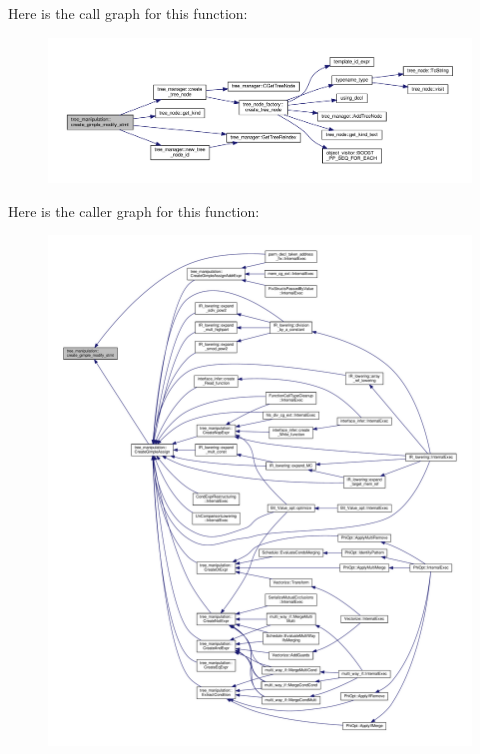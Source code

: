 Here is the call graph for this function\+:
\nopagebreak
\begin{figure}[H]
\begin{center}
\leavevmode
\includegraphics[width=350pt]{d0/d99/classtree__manipulation_adf4268da561eaa877bde497ff5e7b839_cgraph}
\end{center}
\end{figure}
Here is the caller graph for this function\+:
\nopagebreak
\begin{figure}[H]
\begin{center}
\leavevmode
\includegraphics[width=350pt]{d0/d99/classtree__manipulation_adf4268da561eaa877bde497ff5e7b839_icgraph}
\end{center}
\end{figure}
\mbox{\label{classtree__manipulation_a9b9752f4d0e8314a0491ced9b74cfa92}} 
